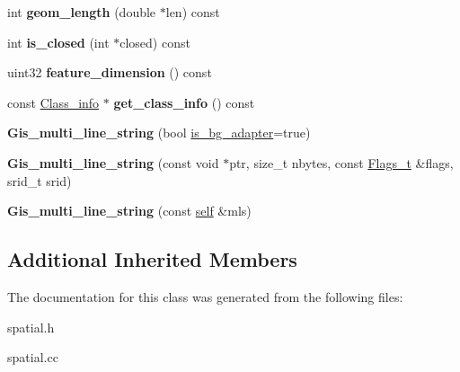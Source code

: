 \begin{DoxyCompactItemize}
int {\bfseries geom\+\_\+length} (double $\ast$len) const
\item 
\mbox{\label{classGis__multi__line__string_a41adbcd88ffda9bcc8e1a6adef2691b5}} 
int {\bfseries is\+\_\+closed} (int $\ast$closed) const
\item 
\mbox{\label{classGis__multi__line__string_aa8769507ca4b26aff8610a3198e624f0}} 
uint32 {\bfseries feature\+\_\+dimension} () const
\item 
\mbox{\label{classGis__multi__line__string_a4b9c21c4493bcd5c97271bf4ba5f2784}} 
const \mbox{\hyperlink{classGeometry_1_1Class__info}{Class\+\_\+info}} $\ast$ {\bfseries get\+\_\+class\+\_\+info} () const
\item 
\mbox{\label{classGis__multi__line__string_ae54fd9373ddb8706768fae212a33dec6}} 
{\bfseries Gis\+\_\+multi\+\_\+line\+\_\+string} (bool \mbox{\hyperlink{classGeometry_ada614004627a9e7af129e51a34242af9}{is\+\_\+bg\+\_\+adapter}}=true)
\item 
\mbox{\label{classGis__multi__line__string_a90bb7708d8e677e44b747edb25f2542f}} 
{\bfseries Gis\+\_\+multi\+\_\+line\+\_\+string} (const void $\ast$ptr, size\+\_\+t nbytes, const \mbox{\hyperlink{classGeometry_1_1Flags__t}{Flags\+\_\+t}} \&flags, srid\+\_\+t srid)
\item 
\mbox{\label{classGis__multi__line__string_ae7b2d94fbd663554bc84cb2d5794a426}} 
{\bfseries Gis\+\_\+multi\+\_\+line\+\_\+string} (const \mbox{\hyperlink{classGis__multi__line__string}{self}} \&mls)
\end{DoxyCompactItemize}
\subsection*{Additional Inherited Members}


The documentation for this class was generated from the following files\+:\begin{DoxyCompactItemize}
\item 
spatial.\+h\item 
spatial.\+cc\end{DoxyCompactItemize}
